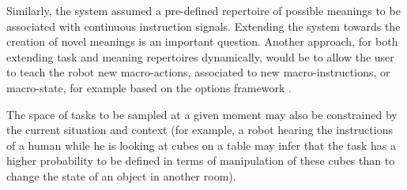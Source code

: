 Similarly, the system assumed a pre-defined repertoire of possible meanings to be associated with continuous instruction signals. Extending the system towards the creation of novel meanings is an important question. Another approach, for both extending task and meaning repertoires dynamically, would be to allow the user to teach the robot new macro-actions, associated to new macro-instructions, or macro-state, for example based on the options framework \cite{sutton1999between}.

The space of tasks to be sampled at a given moment may also be constrained by the current situation and context (for example, a robot hearing the instructions of a human while he is looking at cubes on a table may infer that the task has a higher probability to be defined in terms of manipulation of these cubes than to change the state of an object in another room). 